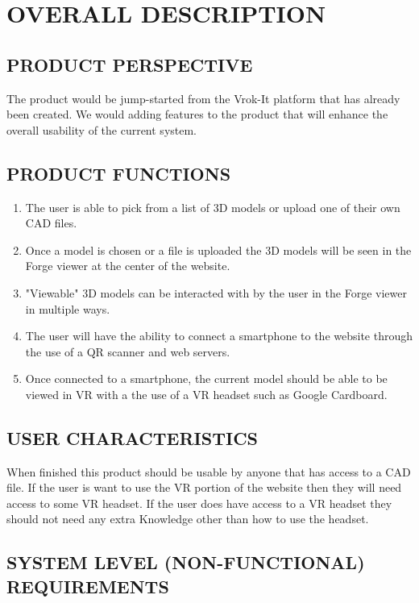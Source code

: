 \documentclass[letterpaper, 10pt, draftclsnofoot, compsoc, onecolumn]{IEEEtran}
\begin{document}
\clearpage

\section{OVERALL DESCRIPTION}

\subsection{PRODUCT PERSPECTIVE}
	The product would be jump-started from the Vrok-It platform that has already been created. 
	We would adding features to the product that will enhance the overall usability of the current system. 

\subsection{PRODUCT FUNCTIONS}
	\begin{enumerate}
	 	\item The user is able to pick from a list of 3D models or upload one of their own CAD files.
		\item Once a model is chosen or a file is uploaded the 3D models will be seen in the Forge viewer at the 
		center of the website.
		\item "Viewable" 3D models can be interacted with by the user in the Forge viewer in multiple ways.

		\item The user will have the ability to connect a smartphone to the website through the use of a QR scanner
		and web servers.

		\item Once connected to a smartphone, the current model should be able to be viewed in VR with a the use
		of a VR headset such as Google Cardboard. 
	\end{enumerate}

\subsection{USER CHARACTERISTICS}
	When finished this product should be usable by anyone that has access to a CAD file. If the user is want to use the VR 
	portion of the website then they will need access to some VR headset. If the user does have access to a VR headset they 
	should not need any extra Knowledge other than how to use the headset.  

\subsection{SYSTEM LEVEL (NON-FUNCTIONAL) REQUIREMENTS}
\end{document}
